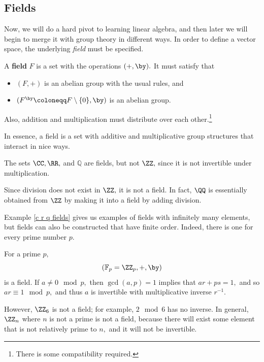 \subsection{Fields}

Now, we will do a hard pivot to learning linear algebra, and then later we will begin to merge it with group theory in different ways. In order to define a vector space, the underlying \emph{field} must be specified.
\begin{definition}
A \textbf{field} $F$ is a set with the operations $(+, \by).$ It must satisfy that 
\begin{itemize}
    \item $(F, +)$ is an abelian group with the usual rules, and
    \item $(F^{\by} \coloneqq F \setminus \{0\}, \by)$ is an abelian group.
\end{itemize}
Also, addition and multiplication must distribute over each other.\footnote{There is some compatibility required.} %
\end{definition}

In essence, a field is a set with additive and multiplicative group structures that interact in nice ways.
\begin{example}\label{c r q fields}
The sets $\CC, \RR, $ and $\mathbb{Q}$ are fields, but not $\ZZ,$ since it is not invertible under multiplication.
\end{example}

Since division does not exist in $\ZZ,$ it is not a field. In fact, $\QQ$ is essentially obtained from $\ZZ$ by making it into a field by adding division.

Example \ref{c r q fields} gives us examples of fields with infinitely many elements, but fields can also be constructed that have finite order. Indeed, there is one for every prime number $p.$
\begin{example}
For a prime $p,$ 
\[
(\mathbb{F}_p = \ZZ_p, +, \by)
\]
is a field. If $a \neq 0 \mod p,$ then $\gcd(a, p) = 1$ implies that $ar + ps = 1,$ and so $ar \equiv 1 \mod p,$ and thus $a$ is invertible with multiplicative inverse $r^{-1}.$
\end{example}

However, $\ZZ_6$ is not a field; for example, $2 \mod 6$ has no inverse. In general, $\ZZ_n$ where $n$ is not a prime is not a field, because there will exist some element that is not relatively prime to $n,$ and it will not be invertible. %

